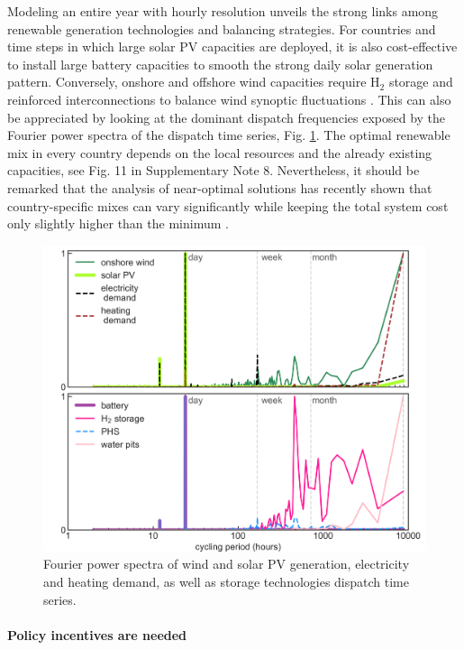 \documentclass[5p]{elsarticle} %
\begin{document}
Modeling an entire year with hourly resolution unveils the strong links among renewable generation technologies and balancing strategies. For countries and time steps in which large solar PV capacities are deployed, it is also cost-effective to install large battery capacities to smooth the strong daily solar generation pattern. Conversely, onshore and offshore wind capacities require H$_2$ storage and reinforced interconnections to balance wind synoptic fluctuations \cite{Rasmussen_2012, Rodriguez_2014, Schlachtberger_2017, Victoria_2019_storage}. This can also be appreciated by looking at the dominant dispatch frequencies exposed by the Fourier power spectra of the dispatch time series, Fig. \ref{fig_Fourier}. The optimal renewable mix in every country depends on the local resources and the already existing capacities, see Fig. 11 in Supplementary Note 8. Nevertheless, it should be remarked that the analysis of near-optimal solutions has recently shown that country-specific mixes can vary significantly while keeping the total system cost only slightly higher than the minimum \cite{Neumann_2019}. 

\begin{figure}[!h]
\centering
\includegraphics[width=\columnwidth]{figures/Fourier.png}
\caption{Fourier power spectra of wind and solar PV generation, electricity and heating demand, as well as storage technologies dispatch time series.} \label{fig_Fourier} 
\end{figure}

\FloatBarrier
 
\paragraph{\textbf{Policy incentives are needed}} \
\end{document}
